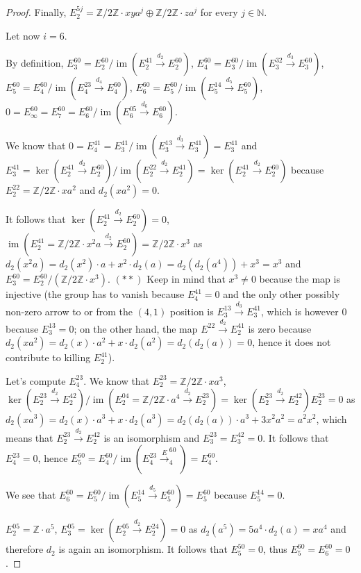 \documentclass{article}
\newcommand{\numberset}{\mathbb}
\newcommand{\N}{\numberset{N}}
\newcommand{\Z}{\numberset{Z}}
\DeclareMathOperator{\im}{im}
\begin{document}
\begin{proof}
    Finally, $E^{5j}_2=\Z/2\Z\cdot xya^j\oplus\Z/2\Z\cdot za^j$ for every
    $j\in\N$.

    Let now $i=6$.

    By definition, $E^{60}_3=E^{60}_2/\im(E^{41}_2\xrightarrow{d_2}E^{60}_2)$,
    $E^{60}_4=E^{60}_3/\im(E^{32}_3\xrightarrow{d_3}E^{60}_3)$,
    $E^{60}_5=E^{60}_4/\im(E^{23}_4\xrightarrow{d_4}E^{60}_4)$,
    $E^{60}_6=E^{60}_5/\im(E^{14}_5\xrightarrow{d_5}E^{60}_5)$,
    $0=E^{60}_\infty=E^{60}_7=E^{60}_6/\im(E^{05}_6\xrightarrow{d_6}E^{60}_6)$.

    We know that
    $0=E^{41}_4=E^{41}_3/\im(E^{13}_3\xrightarrow{d_3}E^{41}_3)=E^{41}_3$ and
    $E^{41}_3=\ker(E^{41}_2\xrightarrow{d_2}E^{60}_2)/
    \im(E^{22}_2\xrightarrow{d_2}E^{41}_2)=\ker(E^{41}_2\xrightarrow{d_2}E^{60}_2)$
    because $E^{22}_2=\Z/2\Z\cdot xa^2$ and $d_2(xa^2)=0$.

    It follows that $\ker(E^{41}_2\xrightarrow{d_2}E^{60}_2)=0$,
    $\im(E^{41}_2=\Z/2\Z\cdot x^2a\xrightarrow{d_2}E^{60}_2)=\Z/2\Z\cdot x^3$ as
    $d_2(x^2a)=d_2(x^2)\cdot a+x^2\cdot d_2(a)=d_2(d_2(a^4))+x^3=x^3$ and
    $E^{60}_3=E^{60}_2/(\Z/2\Z\cdot x^3)$. $(**)$ Keep in mind that $x^3\neq 0$
    because the map is injective (the group has to vanish because $E^{41}_4=0$
    and the only other possibly non-zero arrow to
    or from the $(4,1)$ position is $E^{13}_3\xrightarrow{d_3}E^{41}_3$, which
    is however 0 because $E^{13}_3=0$; on the other hand, the map $E^{22}
    \xrightarrow{d_2}E^{41}_2$ is zero because $d_2(xa^2)=d_2(x)\cdot a^2+x\cdot
    d_2(a^2)=d_2(d_2(a))=0$, hence it does not contribute to killing $E^{41}_2$).

    Let's compute $E^{23}_4$. We know that $E^{23}_2=\Z/2\Z\cdot xa^3$,
    $\ker(E^{23}_2\xrightarrow{d_2}E^{42}_2)/\im(E^{04}_2=\Z/2\Z\cdot a^4
    \xrightarrow{d_2}E^{23}_2)=\ker(E^{23}_2\xrightarrow{d_2}E^{42}_2)
    E^{23}_2=0$ as $d_2(xa^3)=d_2(x)\cdot a^3+x\cdot d_2(a^3)=d_2(d_2(a))\cdot
    a^3+3x^2a^2=a^2x^2$, which means that $E^{23}_2\xrightarrow{d_2}E^{42}_2$ is
    an isomorphism and $E^{23}_3=E^{42}_3=0$. It follows that $E^{23}_4=0$,
    hence $E^{60}_5=E^{60}_4/\im(E^{23}_4\xrightarrow E^{60}_4)=E^{60}_4$.

    We see that
    $E^{60}_6=E^{60}_5/\im(E^{14}_5\xrightarrow{d_5}E^{60}_5)=E^{60}_5$ because
    $E^{14}_5=0$.

    $E^{05}_2=\Z\cdot a^5$,
    $E^{05}_3=\ker(E^{05}_2\xrightarrow{d_2}E^{24}_2)=0$ as
    $d_2(a^5)=5a^4\cdot d_2(a)=xa^4$ and therefore $d_2$ is again an
    isomorphism. It follows that $E^{50}_5=0$, thus $E^{60}_5=E^{60}_6=0$.


\end{proof}
\end{document}
